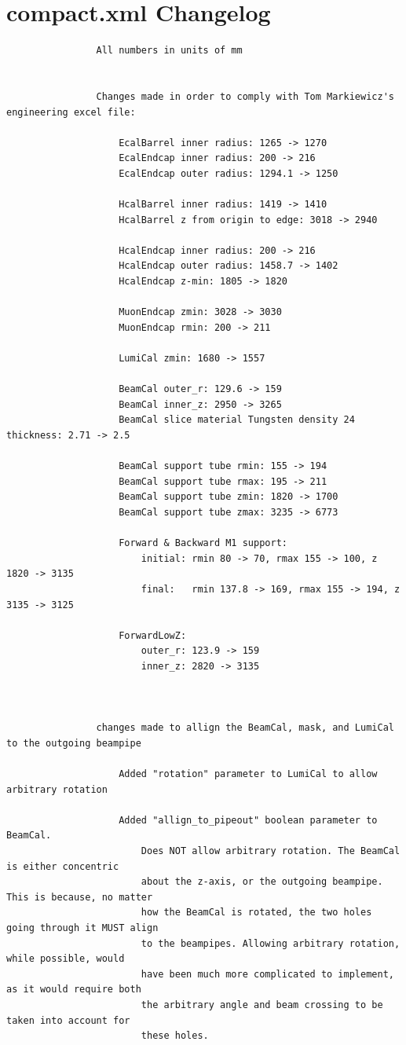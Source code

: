 \documentclass{report}
\begin{document}
        \section{compact.xml Changelog} \label{sect:compact_changes}
            \begin{verbatim}
                All numbers in units of mm


                Changes made in order to comply with Tom Markiewicz's engineering excel file:

                    EcalBarrel inner radius: 1265 -> 1270
                    EcalEndcap inner radius: 200 -> 216
                    EcalEndcap outer radius: 1294.1 -> 1250

                    HcalBarrel inner radius: 1419 -> 1410
                    HcalBarrel z from origin to edge: 3018 -> 2940

                    HcalEndcap inner radius: 200 -> 216
                    HcalEndcap outer radius: 1458.7 -> 1402
                    HcalEndcap z-min: 1805 -> 1820

                    MuonEndcap zmin: 3028 -> 3030
                    MuonEndcap rmin: 200 -> 211

                    LumiCal zmin: 1680 -> 1557

                    BeamCal outer_r: 129.6 -> 159
                    BeamCal inner_z: 2950 -> 3265
                    BeamCal slice material Tungsten density 24 thickness: 2.71 -> 2.5
                    
                    BeamCal support tube rmin: 155 -> 194
                    BeamCal support tube rmax: 195 -> 211
                    BeamCal support tube zmin: 1820 -> 1700
                    BeamCal support tube zmax: 3235 -> 6773

                    Forward & Backward M1 support:
                        initial: rmin 80 -> 70, rmax 155 -> 100, z 1820 -> 3135
                        final:   rmin 137.8 -> 169, rmax 155 -> 194, z 3135 -> 3125

                    ForwardLowZ:
                        outer_r: 123.9 -> 159
                        inner_z: 2820 -> 3135



                changes made to allign the BeamCal, mask, and LumiCal to the outgoing beampipe

                    Added "rotation" parameter to LumiCal to allow arbitrary rotation

                    Added "allign_to_pipeout" boolean parameter to BeamCal. 
                        Does NOT allow arbitrary rotation. The BeamCal is either concentric 
                        about the z-axis, or the outgoing beampipe. This is because, no matter
                        how the BeamCal is rotated, the two holes going through it MUST align 
                        to the beampipes. Allowing arbitrary rotation, while possible, would
                        have been much more complicated to implement, as it would require both
                        the arbitrary angle and beam crossing to be taken into account for 
                        these holes.


\end{verbatim}
\end{document}

